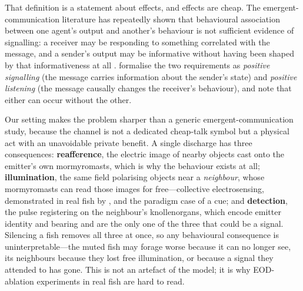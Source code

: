 \documentclass[10pt,twoside]{article}
\newcommand{\eod}{EOD}
\begin{document}
That definition is a statement about effects, and effects are cheap. The
emergent-communication literature has repeatedly shown that behavioural
association between one agent's output and another's behaviour is not sufficient
evidence of signalling: a receiver may be responding to something correlated with
the message, and a sender's output may be informative without having been shaped
by that informativeness at all
\citep{lowe2019pitfalls,jaques2019social}. \citet{lowe2019pitfalls} formalise the
two requirements as \emph{positive signalling} (the message carries information
about the sender's state) and \emph{positive listening} (the message causally
changes the receiver's behaviour), and note that either can occur without the
other.

Our setting makes the problem sharper than a generic emergent-communication
study, because the channel is not a dedicated cheap-talk symbol but a physical act
with an unavoidable private benefit. A single discharge has three consequences:
\textbf{reafference}, the electric image of nearby objects cast onto the emitter's
own mormyromasts, which is why the behaviour exists at all; \textbf{illumination},
the same field polarising objects near a \emph{neighbour}, whose mormyromasts can
read those images for free---collective electrosensing, demonstrated in real fish
by \citet{pedraja2024collective}, and the paradigm case of a cue; and
\textbf{detection}, the pulse registering on the neighbour's knollenorgans, which
encode emitter identity and bearing and are the only one of the three that could
be a signal. Silencing a fish removes all three at once, so any behavioural
consequence is uninterpretable---the muted fish may forage worse because it can no
longer see, its neighbours because they lost free illumination, or because a
signal they attended to has gone. This is not an artefact of the model; it is why
\eod-ablation experiments in real fish are hard to read.
\end{document}
